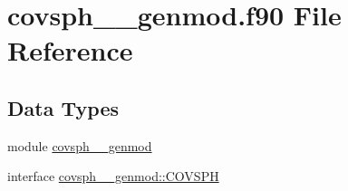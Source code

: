 \hypertarget{covsph____genmod_8f90}{\section{covsph\+\_\+\+\_\+genmod.\+f90 File Reference}
\label{covsph____genmod_8f90}
}
\subsection*{Data Types}
\begin{DoxyCompactItemize}
\item 
module \hyperlink{classcovsph____genmod}{covsph\+\_\+\+\_\+genmod}
\item 
interface \hyperlink{interfacecovsph____genmod_1_1COVSPH}{covsph\+\_\+\+\_\+genmod\+::\+C\+O\+V\+S\+P\+H}
\end{DoxyCompactItemize}
